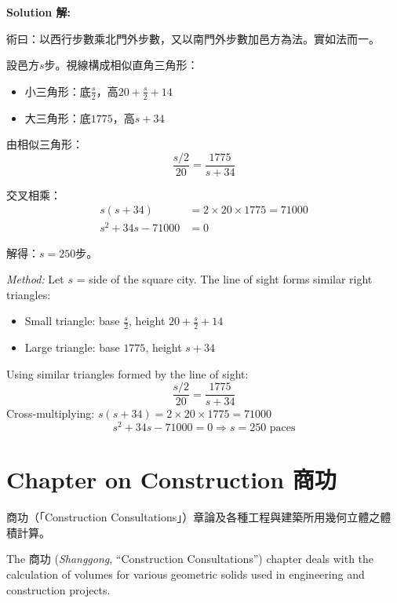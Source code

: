\documentclass[11pt,a4paper]{article}
\newcommand{\zh}[1]{{\CJKfamily{\CJKrmdefault} #1}}
\newenvironment{chside}{%
  \begin{minipage}[t]{0.48\textwidth}%
  \setlength{\parindent}{1.5em}%
  \linespread{1.25}\selectfont%
  \small%
}{%
  \end{minipage}%
}
\newenvironment{enside}{%
  \hfill\begin{minipage}[t]{0.48\textwidth}%
  \setlength{\parindent}{1em}%
  \linespread{1.15}\selectfont%
  \small%
}{%
  \end{minipage}%
}
\newenvironment{solution}{%
  \par\medskip\noindent\textbf{\textcolor{notecolor}{Solution \zh{解}:}}\par\nopagebreak
  \small\setlength{\parindent}{1em}%
}{%
  \par\medskip%
}
\begin{document}
\begin{solution}
\noindent\begin{chside}
\zh{術曰：以西行步數乘北門外步數，又以南門外步數加邑方為法。實如法而一。}

設邑方$s$步。視線構成相似直角三角形：
\begin{itemize}[leftmargin=1em,topsep=0pt]
  \item 小三角形：底$\frac{s}{2}$，高$20 + \frac{s}{2} + 14$
  \item 大三角形：底$1775$，高$s + 34$
\end{itemize}

由相似三角形：
\[
\frac{s/2}{20} = \frac{1775}{s + 34}
\]

交叉相乘：
\begin{align*}
s(s + 34) &= 2 \times 20 \times 1775 = 71000 \\
s^2 + 34s - 71000 &= 0
\end{align*}

解得：$s = 250$步。
\end{chside}%
\begin{enside}
\textit{Method:} Let $s$ = side of the square city. The line of sight forms
similar right triangles:
\begin{itemize}[leftmargin=1em,topsep=0pt]
  \item Small triangle: base $\frac{s}{2}$, height $20 + \frac{s}{2} + 14$
  \item Large triangle: base $1775$, height $s + 34$
\end{itemize}
Using similar triangles formed by the line of sight:
\[
\frac{s/2}{20} = \frac{1775}{s + 34}
\]
Cross-multiplying: $s(s + 34) = 2 \times 20 \times 1775 = 71000$
\[
s^2 + 34s - 71000 = 0 \Rightarrow s = 250 \text{ paces}
\]
\end{enside}
\end{solution}

\newpage

\section{Chapter on Construction \zh{商功}}
\label{sec:shanggong}

\noindent\begin{chside}
\zh{商功}（「Construction Consultations」）章論及各種工程與建築所用幾何立體之體積計算。
\end{chside}%
\begin{enside}
The \zh{商功} (\textit{Shanggong}, ``Construction Consultations'') chapter
deals with the calculation of volumes for various geometric solids used in
engineering and construction projects.
\end{enside}
\end{document}
